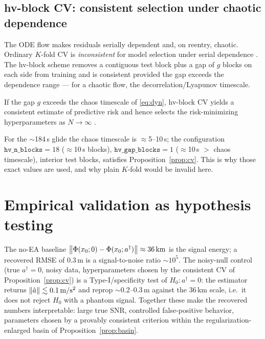 \subsection{hv-block CV: consistent selection under chaotic dependence}

The ODE flow makes residuals serially dependent and, on reentry,
chaotic. Ordinary $K$-fold CV is \emph{inconsistent} for model selection
under serial dependence \cite{burman1994,arlot2010}. The hv-block scheme
\cite{racine2000} removes a contiguous test block plus a gap of $g$ blocks
on each side from training and is consistent provided the gap exceeds the
dependence range --- for a chaotic flow, the decorrelation/Lyapunov
timescale.

\begin{proposition}
\label{prop:cv}
If the gap $g$ exceeds the chaos timescale of \eqref{eq:dyn}, hv-block CV
yields a consistent estimate of predictive risk and hence selects the
risk-minimizing hyperparameters as $N\to\infty$ \cite{racine2000}.
\end{proposition}

For the $\sim$184\,s glide the chaos timescale is $\approx$5--10\,s; the
configuration $\texttt{hv\_n\_blocks}=18$ ($\approx$10\,s blocks),
$\texttt{hv\_gap\_blocks}=1$ ($\approx$10\,s $>$ chaos timescale),
interior test blocks, satisfies Proposition~\ref{prop:cv}. This is why
those exact values are used, and why plain $K$-fold would be invalid here.

\section{Empirical validation as hypothesis testing}

The no-EA baseline $\left\lVert\Phi(x_0;0)-\Phi(x_0;a^\dagger)\right\rVert\approx
36\,\mathrm{km}$ is the signal energy; a recovered RMSE of $0.3$\,m is a
signal-to-noise ratio $\sim10^{5}$. The noisy-null control (true
$a^\dagger=0$, noisy data, hyperparameters chosen by the consistent CV of
Proposition~\ref{prop:cv}) is a Type-I/specificity test of
$H_0\!:a^\dagger=0$: the estimator returns $\left\lVert\hat a\right\rVert\lesssim
0.1\,\mathrm{m/s^2}$ and reprop $\sim$0.2--0.3\,m against the 36\,km
scale, i.e.\ it does not reject $H_0$ with a phantom signal. Together
these make the recovered numbers interpretable: large true SNR, controlled
false-positive behavior, parameters chosen by a provably consistent
criterion within the regularization-enlarged basin of
Proposition~\ref{prop:basin}.
